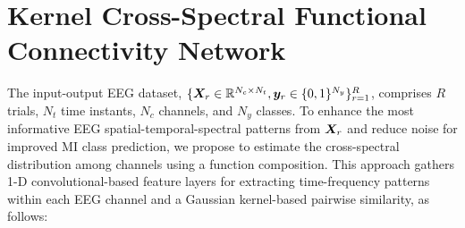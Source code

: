 \section{Kernel Cross-Spectral Functional Connectivity Network}\label{sec:gcnet}
	
	The input-output EEG dataset, $\{\bm {X}_r \in \mathbb{R}^{N_c \times N_t}, \bm {y}_r \in\{0,1\}^{N_y}\}^R_{r=1}$, comprises $R$ trials, $N_t$ time instants, $N_c$ channels, and $N_y$ classes. To enhance the most informative EEG spatial-temporal-spectral patterns from $\bm {X}_r$ and reduce noise for improved MI class prediction, we propose to estimate the cross-spectral distribution among channels using a function composition. This approach gathers 1-D convolutional-based feature layers for extracting time-frequency patterns within each EEG channel and a Gaussian kernel-based pairwise similarity, as follows:
